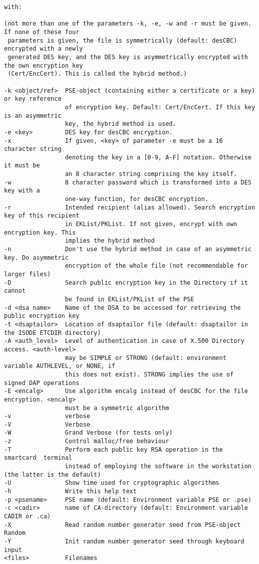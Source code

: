{\begin{verbatim}
with:

(not more than one of the parameters -k, -e, -w and -r must be given. If none of these four
 parameters is given, the file is symmetrically (default: desCBC) encrypted with a newly 
 generated DES key, and the DES key is asymmetrically encrypted with the own encryption key
 (Cert/EncCert). This is called the hybrid method.)

-k <object/ref>  PSE-object (containing either a certificate or a key) or key reference 
                 of encryption key. Default: Cert/EncCert. If this key is an asymmetric
                 key, the hybrid method is used.
-e <key>         DES key for desCBC encryption.
-x               If given, <key> of parameter -e must be a 16 character string
                 denoting the key in a [0-9, A-F] notation. Otherwise it must be
                 an 8 character string comprising the key itself.
-w               8 character password which is transformed into a DES key with a
                 one-way function, for desCBC encryption.
-r               Intended recipient (alias allowed). Search encryption key of this recipient
                 in EKList/PKList. If not given, encrypt with own encryption key. This
                 implies the hybrid method
-n               Don't use the hybrid method in case of an asymmetric key. Do asymmetric
                 encryption of the whole file (not recommendable for larger files)
-D               Search public encryption key in the Directory if it cannot
                 be found in EKList/PKList of the PSE
-d <dsa name>    Name of the DSA to be accessed for retrieving the public encryption key
-t <dsaptailor>  Location of dsaptailor file (default: dsaptailor in the ISODE ETCDIR directory)
-A <auth_level>  Level of authentication in case of X.500 Directory access. <auth-level>
                 may be SIMPLE or STRONG (default: environment variable AUTHLEVEL, or NONE, if
                 this does not exist). STRONG implies the use of signed DAP operations
-E <encalg>      Use algorithm encalg instead of desCBC for the file encryption. <encalg>
                 must be a symmetric algorithm
-v               verbose
-V               Verbose
-W               Grand Verbose (for tests only)
-z               Control malloc/free behaviour
-T               Perform each public key RSA operation in the smartcard  terminal
                 instead of employing the software in the workstation (the latter is the default)
-U               Show time used for cryptographic algorithms
-h               Write this help text
-p <psename>     PSE name (default: Environment variable PSE or .pse)
-c <cadir>       name of CA-directory (default: Environment variable CADIR or .ca)
-X               Read random number generator seed from PSE-object Random
-Y               Init random number generator seed through keyboard input
<files>          Filenames


\end{verbatim}}
